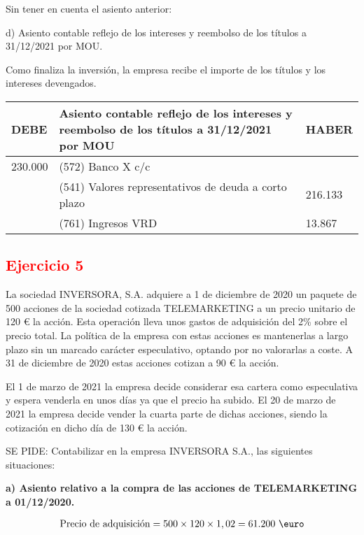 Sin tener en cuenta el asiento anterior:

d) Asiento contable reflejo de los intereses y reembolso de los títulos a 31/12/2021 por MOU.

Como finaliza la inversión, la empresa recibe el importe de los títulos y los intereses devengados.

\begin{table}[H]
    \centering
    \begin{tabular}{|p{3cm}|p{6cm}|p{3cm}|}
    \hline
    \rowcolor{blue!30}
    \textbf{DEBE} & \textbf{Asiento contable reflejo de los intereses y reembolso de los títulos a 31/12/2021 por MOU} & \textbf{HABER} \\
    \hline
    230.000 & (572) Banco X c/c & \\
    \hline
    & (541) Valores representativos de deuda a corto plazo & 216.133 \\
    \hline
    & (761) Ingresos VRD & 13.867 \\
    \hline
    \end{tabular}
\end{table}

\newpage
\subsection*{\textcolor{red}{\textbf{Ejercicio 5}}}

La sociedad INVERSORA, S.A. adquiere a 1 de diciembre de 2020 un paquete de 500 acciones de la sociedad cotizada TELEMARKETING a un precio unitario de 120 € la acción. Esta operación lleva unos gastos de adquisición del 2\% sobre el precio total. La política de la empresa con estas acciones es mantenerlas a largo plazo sin un marcado carácter especulativo, optando por no valorarlas a coste. A 31 de diciembre de 2020 estas acciones cotizan a 90 € la acción.

El 1 de marzo de 2021 la empresa decide considerar esa cartera como especulativa y espera venderla en unos días ya que el precio ha subido. El 20 de marzo de 2021 la empresa decide vender la cuarta parte de dichas acciones, siendo la cotización en dicho día de 130 € la acción.

SE PIDE: Contabilizar en la empresa INVERSORA S.A., las siguientes situaciones:

\textbf{a) Asiento relativo a la compra de las acciones de TELEMARKETING a 01/12/2020.}

\begin{align*}
    \text{Precio de adquisición} = 500 \times 120 \times 1,02 = 61.200 \text{ \euro}
\end{align*}

